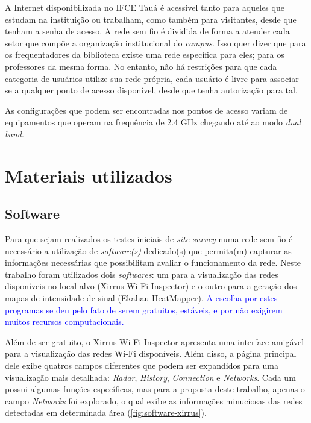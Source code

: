 A Internet disponibilizada no IFCE Tauá é acessível tanto para aqueles que estudam na instituição ou trabalham, como também para visitantes, desde que tenham a senha de acesso. A rede sem fio é dividida de forma a atender cada setor que compõe a organização institucional do \textit{campus}. Isso quer dizer que para os frequentadores da biblioteca existe uma rede específica para eles; para os professores da mesma forma. No entanto, não há restrições para que cada categoria de usuários utilize sua rede própria, cada usuário é livre para associar-se a qualquer ponto de acesso disponível, desde que tenha autorização para tal.

As configurações que podem ser encontradas nos pontos de acesso variam de equipamentos que operam na frequência de 2.4 GHz chegando até ao modo \textit{dual band}.


\section{Materiais utilizados}
\label{materiais-uyilizados}

\subsection{Software}
\label{subsec:softwares-utiliados}

Para que sejam realizados os testes iniciais de \textit{site survey} numa rede sem fio é necessário a utilização de \textit{software(s)} dedicado(s) que permita(m) capturar as informações necessárias que possibilitam avaliar o funcionamento da rede. Neste trabalho foram utilizados dois \textit{softwares}: um para a visualização das redes disponíveis no local alvo (Xirrus Wi-Fi Inspector) e o outro para a geração dos mapas de intensidade de sinal (Ekahau HeatMapper). \textcolor{blue}{A escolha por estes programas se deu pelo fato de serem gratuitos, estáveis, e por não exigirem muitos recursos computacionais.}

Além de ser gratuito, o Xirrus Wi-Fi Inspector apresenta uma interface amigável para a visualização das redes Wi-Fi disponíveis. Além disso, a página principal dele exibe quatros campos diferentes que podem ser expandidos para uma visualização mais detalhada: \textit{Radar}, \textit{History}, \textit{Connection} e \textit{Networks}. Cada um possui algumas funções específicas, mas para a proposta deste trabalho, apenas o campo \textit{Networks} foi explorado, o qual exibe as informações minuciosas das redes detectadas em determinada área (\autoref{fig:software-xirrus}).

